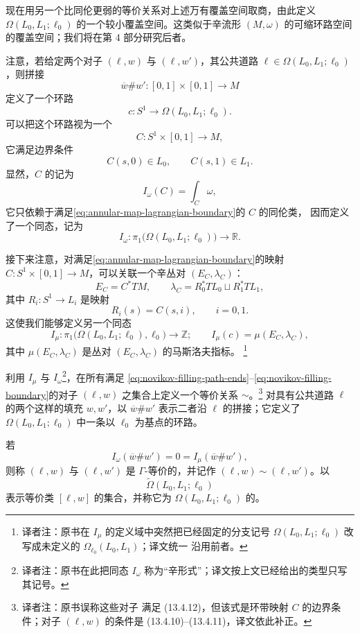 现在用另一个比同伦更弱的等价关系对上述万有覆盖空间取商，由此定义
$\Omega(L_0,L_1;\ell_0)$ 的一个较小覆盖空间。这类似于辛流形
$(M,\omega)$ 的可缩环路空间的\personNovikov{}覆盖空间；我们将在第 4 部分研究后者。

注意，若给定两个对子 $(\ell,w)$ 与 $(\ell,w')$，其公共道路
$\ell\in\Omega(L_0,L_1;\ell_0)$，则拼接
\[
  \overline w\#w':[0,1]\times[0,1]\longrightarrow M
\]
定义了一个环路
\[
  c:S^1\longrightarrow\Omega(L_0,L_1;\ell_0).
\]
可以把这个环路视为一个\termAnnularMap{}
\[
  C:S^1\times[0,1]\longrightarrow M,
\]
它满足边界条件
\begin{equation}
  C(s,0)\in L_0,
  \qquad
  C(s,1)\in L_1.
\label{eq:annular-map-lagrangian-boundary}
\end{equation}
显然，$C$ 的\termSymplecticArea{}记为
\begin{equation}
  I_\omega(C)=\int_C\omega,
\label{eq:annular-symplectic-area}
\end{equation}
它只依赖于满足\eqref{eq:annular-map-lagrangian-boundary}的 $C$ 的同伦类，
因而定义了一个同态，记为
\[
  I_\omega:
  \pi_1\bigl(\Omega(L_0,L_1;\ell_0)\bigr)
  \longrightarrow\mathbb R.
\]

接下来注意，对满足\eqref{eq:annular-map-lagrangian-boundary}的映射
$C:S^1\times[0,1]\to M$，可以关联一个辛丛对 $(E_C,\lambda_C)$：
\[
  E_C=C^*TM,
  \qquad
  \lambda_C=R_0^*TL_0\sqcup R_1^*TL_1,
\]
其中 $R_i:S^1\to L_i$ 是映射
\[
  R_i(s)=C(s,i),
  \qquad i=0,1.
\]
这使我们能够定义另一个同态
\[
  I_\mu:
  \pi_1\bigl(\Omega(L_0,L_1;\ell_0),\ell_0\bigr)
  \longrightarrow\mathbb Z;
  \qquad
  I_\mu(c)=\mu(E_C,\lambda_C),
\]
其中 $\mu(E_C,\lambda_C)$ 是丛对 $(E_C,\lambda_C)$ 的马斯洛夫指标。
\footnote{译者注：原书在 $I_\mu$ 的定义域中突然把已经固定的分支记号
$\Omega(L_0,L_1;\ell_0)$ 改写成未定义的 $\Omega_{\ell_0}(L_0,L_1)$；译文统一
沿用前者。}

利用 $I_\mu$ 与 $I_\omega$\footnote{译者注：原书在此把同态 $I_\omega$
称为“辛形式”；译文按上文已经给出的类型只写其记号。}，在所有满足
\eqref{eq:novikov-filling-path-ends}--\eqref{eq:novikov-filling-boundary}的对子
$(\ell,w)$ 之集合上定义一个等价关系 $\sim$。\footnote{译者注：原书误称这些对子
满足 (13.4.12)，但该式是环带映射 $C$ 的边界条件；对子 $(\ell,w)$ 的条件是
(13.4.10)--(13.4.11)，译文依此补正。}
对具有公共道路 $\ell$ 的两个这样的填充 $w,w'$，以
$\overline w\#w'$ 表示二者沿 $\ell$ 的拼接；它定义了
$\Omega(L_0,L_1;\ell_0)$ 中一条以 $\ell_0$ 为基点的环路。

\begin{definition}
\label{def:gamma-equivalent-fillings}
若
\begin{equation}
  I_\omega(\overline w\#w')=0
  =I_\mu(\overline w\#w'),
\label{eq:gamma-equivalence}
\end{equation}
则称 $(\ell,w)$ 与 $(\ell,w')$ 是 $\Gamma$-等价的，并记作
$(\ell,w)\sim(\ell,w')$。以
\[
  \widetilde\Omega(L_0,L_1;\ell_0)
\]
表示等价类 $[\ell,w]$ 的集合，并称它为
$\Omega(L_0,L_1;\ell_0)$ 的\termGammaCoveringSpace{}。
\end{definition}

